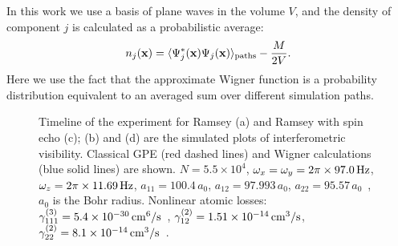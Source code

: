 In this work we use a basis of plane waves in the volume $V$,
and the density of component $j$ is calculated as a probabilistic average:
\begin{equation}
\label{eqn:wigner-density}
    n_j (\mathbf{x})
        = \langle \Psi^*_j (\mathbf{x}) \Psi_j (\mathbf{x}) \rangle_{\mathrm{paths}} - \frac{M}{2V}.
\end{equation}
Here we use the fact that the approximate Wigner function is a probability distribution
equivalent to an averaged sum over different simulation paths.

\begin{figure}

    \caption{
    Timeline of the experiment for Ramsey (a) and Ramsey with spin echo (c); (b) and (d) are the simulated plots of interferometric visibility.
    Classical GPE (red dashed lines) and Wigner calculations (blue solid lines) are shown.
    $N = 5.5 \times 10^4$,
    $\omega_x = \omega_y = 2 \pi \times 97.0\mbox{\ensuremath{\,\mathrm{Hz}}}$,
    $\omega_z = 2 \pi \times 11.69\mbox{\ensuremath{\,\mathrm{Hz}}}$,
    $a_{11} = 100.4\,a_0$, $a_{12} = 97.993\,a_0$, $a_{22} = 95.57\,a_0$~\cite{Egorov2011},
    $a_0$ is the Bohr radius.
    Nonlinear atomic losses:
    $\gamma^{(3)}_{111} = 5.4 \times 10^{-30}\mbox{\ensuremath{\,\mathrm{cm^6/s}}}$~\cite{Mertes2007},
    $\gamma^{(2)}_{12} = 1.51 \times 10^{-14}\mbox{\ensuremath{\,\mathrm{cm^3/s}}}$,
    $\gamma^{(2)}_{22} = 8.1 \times 10^{-14}\mbox{\ensuremath{\,\mathrm{cm^3/s}}}$~\cite{Egorov2011}.}

    \label{fig:visibility}
\end{figure}

